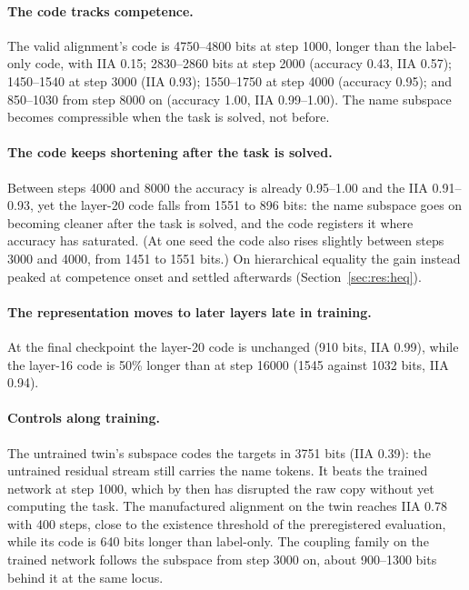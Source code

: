 \documentclass[11pt,a4paper]{article}
\begin{document}
\paragraph{The code tracks competence.} The valid alignment's code is 4750--4800 bits at step 1000, longer than the label-only code, with IIA 0.15; 2830--2860 bits at step 2000 (accuracy 0.43, IIA 0.57); 1450--1540 at step 3000 (IIA 0.93); 1550--1750 at step 4000 (accuracy 0.95); and 850--1030 from step 8000 on (accuracy 1.00, IIA 0.99--1.00). The name subspace becomes compressible when the task is solved, not before.

\paragraph{The code keeps shortening after the task is solved.} Between steps 4000 and 8000 the accuracy is already 0.95--1.00 and the IIA 0.91--0.93, yet the layer-20 code falls from 1551 to 896 bits: the name subspace goes on becoming cleaner after the task is solved, and the code registers it where accuracy has saturated. (At one seed the code also rises slightly between steps 3000 and 4000, from 1451 to 1551 bits.) On hierarchical equality the gain instead peaked at competence onset and settled afterwards (Section~\ref{sec:res:heq}).

\paragraph{The representation moves to later layers late in training.} At the final checkpoint the layer-20 code is unchanged (910 bits, IIA 0.99), while the layer-16 code is 50\% longer than at step 16000 (1545 against 1032 bits, IIA 0.94).

\paragraph{Controls along training.} The untrained twin's subspace codes the targets in 3751 bits (IIA 0.39): the untrained residual stream still carries the name tokens. It beats the trained network at step 1000, which by then has disrupted the raw copy without yet computing the task. The manufactured alignment on the twin reaches IIA 0.78 with 400 steps, close to the existence threshold of the preregistered evaluation, while its code is 640 bits longer than label-only. The coupling family on the trained network follows the subspace from step 3000 on, about 900--1300 bits behind it at the same locus.
\end{document}
